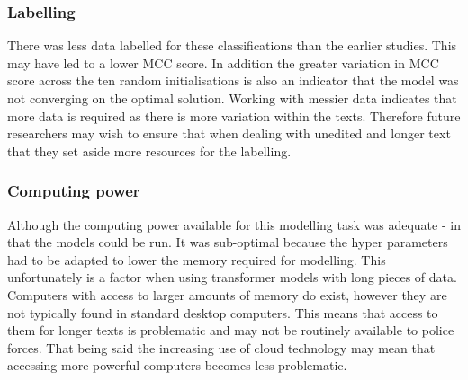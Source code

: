 \subsubsection{Labelling} There was less data labelled for these classifications than the earlier studies. This may have led to a lower MCC score. In addition the greater variation in MCC score across the ten random initialisations is also an indicator that the model was not converging on the optimal solution. Working with messier data indicates that more data is required as there is more variation within the texts. Therefore future researchers may wish to ensure that when dealing with unedited and longer text that they set aside more resources for the labelling.

\subsubsection{Computing power}Although the computing power available for this modelling task was adequate - in that the models could be run. It was  sub-optimal because the hyper parameters had to be adapted to lower the memory required for modelling. This unfortunately is a factor when using transformer models with long pieces of data. Computers with access to larger amounts of memory do exist, however they are not typically found in standard desktop computers. This means that access to them for longer texts is problematic and may not be routinely available to police forces. That being said the increasing use of cloud technology may mean that accessing more powerful computers becomes less problematic.

 
